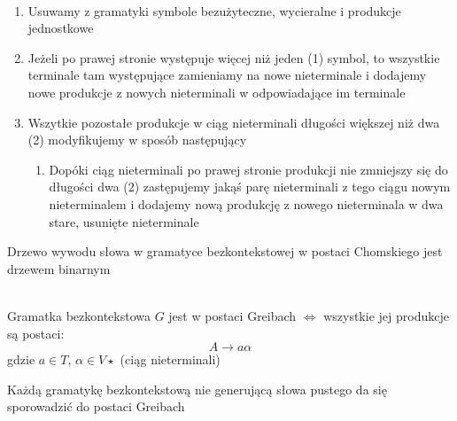 	\begin{alg}~\\
		\begin{enumerate}
			\item Usuwamy z gramatyki symbole bezużyteczne, wycieralne i produkcje jednostkowe
			\item Jeżeli po prawej stronie występuje więcej niż jeden (1) symbol, to wszystkie
			terminale tam występujące zamieniamy na nowe nieterminale i dodajemy
			nowe produkcje z nowych nieterminali w odpowiadające im terminale
			\item Wszytkie pozostałe produkcje w ciąg nieterminali długości większej niż dwa (2)
			modyfikujemy w sposób następujący
				\begin{enumerate}
					\item Dopóki ciąg nieterminali po prawej stronie produkcji nie zmniejszy się do długości dwa (2)
					zastępujemy jakąś parę nieterminali z tego ciągu nowym nieterminalem i dodajemy nową produkcję
					z nowego nieterminala w dwa stare, usunięte nieterminale
				\end{enumerate}
		\end{enumerate}
	\end{alg}
	
	\begin{uwaga}
		Drzewo wywodu słowa w gramatyce bezkontekstowej w postaci Chomskiego jest drzewem binarnym
	\end{uwaga}
	
	\begin{df}~\\
		Gramatka bezkontekstowa $G$ jest w postaci Greibach $\Leftrightarrow$ wszystkie jej produkcje są postaci:
		\begin{equation}
			A \rightarrow a\alpha
		\end{equation}
		gdzie $a\in T$, $\alpha \in V\star$ (ciąg nieterminali)
	\end{df}
	
	\begin{lemat}
		Każdą gramatykę bezkontekstową nie generującą słowa pustego da się sporowadzić do postaci Greibach
	\end{lemat}
	
